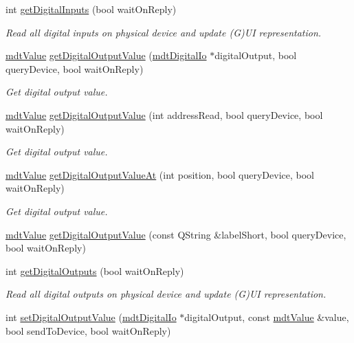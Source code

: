 \begin{DoxyCompactItemize}
int \hyperlink{classmdt_multi_io_device_ab3c1095ed6a0f35b43433d61104fc080}{get\-Digital\-Inputs} (bool wait\-On\-Reply)
\begin{DoxyCompactList}\small\item\em Read all digital inputs on physical device and update (G)U\-I representation. \end{DoxyCompactList}\item 
\hyperlink{classmdt_value}{mdt\-Value} \hyperlink{classmdt_multi_io_device_a6c91a85357863564192b932d22c1c0ce}{get\-Digital\-Output\-Value} (\hyperlink{classmdt_digital_io}{mdt\-Digital\-Io} $\ast$digital\-Output, bool query\-Device, bool wait\-On\-Reply)
\begin{DoxyCompactList}\small\item\em Get digital output value. \end{DoxyCompactList}\item 
\hyperlink{classmdt_value}{mdt\-Value} \hyperlink{classmdt_multi_io_device_a0d3e3a27698823915fca74e778633455}{get\-Digital\-Output\-Value} (int address\-Read, bool query\-Device, bool wait\-On\-Reply)
\begin{DoxyCompactList}\small\item\em Get digital output value. \end{DoxyCompactList}\item 
\hyperlink{classmdt_value}{mdt\-Value} \hyperlink{classmdt_multi_io_device_a3b95337d6046c2592fc3a0286219cabc}{get\-Digital\-Output\-Value\-At} (int position, bool query\-Device, bool wait\-On\-Reply)
\begin{DoxyCompactList}\small\item\em Get digital output value. \end{DoxyCompactList}\item 
\hyperlink{classmdt_value}{mdt\-Value} \hyperlink{classmdt_multi_io_device_a159f1af1b6e11e38751ffeaf936331d0}{get\-Digital\-Output\-Value} (const Q\-String \&label\-Short, bool query\-Device, bool wait\-On\-Reply)
\item 
int \hyperlink{classmdt_multi_io_device_a15b6ae641d9d6f7a7c90cbc033950652}{get\-Digital\-Outputs} (bool wait\-On\-Reply)
\begin{DoxyCompactList}\small\item\em Read all digital outputs on physical device and update (G)U\-I representation. \end{DoxyCompactList}\item 
int \hyperlink{classmdt_multi_io_device_a0677d7dfba08a059fb81fa83ffbba11a}{set\-Digital\-Output\-Value} (\hyperlink{classmdt_digital_io}{mdt\-Digital\-Io} $\ast$digital\-Output, const \hyperlink{classmdt_value}{mdt\-Value} \&value, bool send\-To\-Device, bool wait\-On\-Reply)

\end{DoxyCompactItemize}
